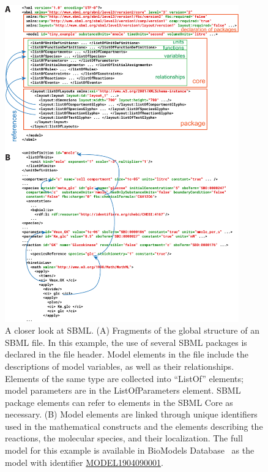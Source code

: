 \documentclass{sbml-paper}
\begin{document}
\begin{figure}[p]
  \center
  \includegraphics[width=0.9\textwidth]{resources/SBML_XML_example_v04.pdf}
  \caption{A closer look at SBML. (A) Fragments of the global structure of an SBML file. In this example, the use of several SBML packages is declared in the file header. Model elements in the file include the descriptions of model variables, as well as their relationships.  Elements of the same type are collected into ``ListOf'' elements; \eg model parameters are in the ListOfParameters element. SBML package elements can refer to elements in the SBML Core as necessary. (B) Model elements are linked through unique identifiers used in the mathematical constructs and the elements describing the reactions, the molecular species, and their localization. The full model for this example is available in BioModels Database~\citep{Malik-Sheriff2020biomodels} as the model with identifier \href{https://identifiers.org/biomodels.db:MODEL1904090001}{MODEL1904090001}.}
\label{fig:examples-sbml}
\end{figure}

\clearpage
\newpage
\end{document}
